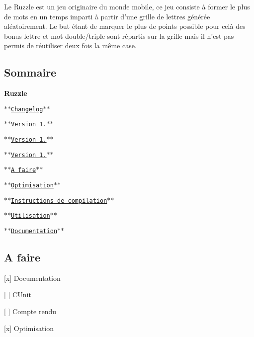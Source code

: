 Le Ruzzle est un jeu originaire du monde mobile, ce jeu consiste à former le plus de mots en un temps imparti à partir d'une grille de lettres générée aléatoirement. Le but étant de marquer le plus de points possible pour celà des bonus lettre et mot double/triple sont répartis sur la grille mais il n'est pas permis de réutiliser deux fois la même case.

\subsection*{Sommaire}

{\bfseries Ruzzle}
\begin{DoxyEnumerate}
\item $\ast$$\ast$\href{#changelog}{\tt Changelog}$\ast$$\ast$
\begin{DoxyItemize}
\item $\ast$$\ast$\href{#version-10}{\tt Version 1.}$\ast$$\ast$
\item $\ast$$\ast$\href{#version-101}{\tt Version 1.}$\ast$$\ast$
\item $\ast$$\ast$\href{#version-108}{\tt Version 1.}$\ast$$\ast$
\end{DoxyItemize}
\item $\ast$$\ast$\href{#a-faire}{\tt A faire}$\ast$$\ast$
\item $\ast$$\ast$\href{#optimisation}{\tt Optimisation}$\ast$$\ast$
\end{DoxyEnumerate}
\begin{DoxyEnumerate}
\item $\ast$$\ast$\href{#instructions-de-compilation}{\tt Instructions de compilation}$\ast$$\ast$
\item $\ast$$\ast$\href{#utilisation}{\tt Utilisation}$\ast$$\ast$
\item $\ast$$\ast$\href{#documentation}{\tt Documentation}$\ast$$\ast$
\end{DoxyEnumerate}

\subsection*{A faire}


\begin{DoxyItemize}
\item \mbox{[}x\mbox{]} Documentation
\item \mbox{[} \mbox{]} C\+Unit
\item \mbox{[} \mbox{]} Compte rendu
\item \mbox{[}x\mbox{]} Optimisation
\end{DoxyItemize}

